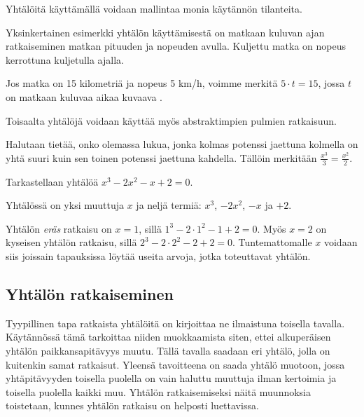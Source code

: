 


Yhtälöitä käyttämällä voidaan mallintaa monia käytännön tilanteita.

\begin{esimerkki}
	Yksinkertainen esimerkki yhtälön käyttämisestä on matkaan kuluvan ajan ratkaiseminen matkan pituuden ja nopeuden avulla. Kuljettu matka on nopeus kerrottuna kuljetulla ajalla. 
	
	Jos matka on 15 kilometriä ja nopeus 5 km/h, voimme merkitä $5\cdot t=15$, jossa $t$ on matkaan kuluvaa aikaa kuvaava .
\end{esimerkki}

Toisaalta yhtälöjä voidaan käyttää myös abstraktimpien pulmien ratkaisuun.

\begin{esimerkki}
	Halutaan tietää, onko olemassa lukua, jonka kolmas potenssi jaettuna kolmella on yhtä suuri kuin sen toinen potenssi jaettuna kahdella. Tällöin merkitään $\frac{x^3}{3}=\frac{x^2}{2}$. 
\end{esimerkki}


\begin{esimerkki}
 Tarkastellaan yhtälöä $x^3-2x^2-x+2=0$. 
 
 Yhtälössä on yksi muuttuja $x$ ja neljä termiä: $x^3$, $-2x^2$, $-x$ ja $+2$.  
 
 Yhtälön \textit{eräs} ratkaisu on $x=1$, sillä $1^3-2\cdot{1^2}-1+2=0$. 
 Myös $x=2$ on kyseisen yhtälön ratkaisu, sillä $2^3-2\cdot{2^2}-2+2=0$. 
 Tuntemattomalle $x$ voidaan siis joissain tapauksissa löytää useita arvoja, jotka toteuttavat yhtälön. 
\end{esimerkki}

\subsection*{Yhtälön ratkaiseminen}

Tyypillinen tapa ratkaista yhtälöitä on kirjoittaa ne ilmaistuna toisella tavalla. Käytännössä tämä tarkoittaa niiden muokkaamista siten, ettei alkuperäisen yhtälön paikkansapitävyys muutu. Tällä tavalla saadaan eri yhtälö, jolla on kuitenkin samat ratkaisut. Yleensä tavoitteena on saada yhtälö muotoon, jossa yhtäpitävyyden toisella puolella on vain haluttu muuttuja ilman kertoimia ja toisella puolella kaikki muu.  Yhtälön ratkaisemiseksi näitä muunnoksia toistetaan, kunnes yhtälön ratkaisu on helposti luettavissa.

